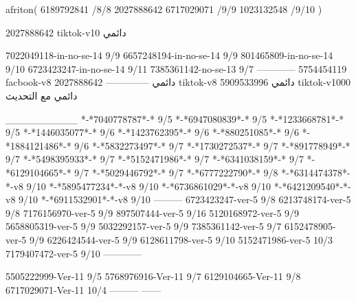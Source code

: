 afriton(
6189792841 /8/8
2027888642
6717029071 /9/9
1023132548 /9/10
)

2027888642 tiktok-v10
دائمي

7022049118-in-no-se-14 9/9
6657248194-in-no-se-14 9/9
801465809-in-no-se-14 9/10
6723423247-in-no-se-14 9/11
7385361142-no-se-13
9/7
------------
5754454119 facbook-v8
دائمي
--------------
2027888642 tiktok-v8
دائمي
5909533996 tiktok-v1000
دائمي مع التحديث

__________
*-*7040778787*-* 9/5
*-*6947080839*-* 9/5
*-*1233668781*-* 9/5
*-*1446035077*-* 9/6
*-*1423762395*-* 9/6
*-*880251085*-* 9/6
*-*1884121486*-* 9/6
*-*5832273497*-* 9/7
*-*1730272537*-* 9/7
*-*891778949*-* 9/7
*-*5498395933*-* 9/7
*-*5152471986*-* 9/7
*-*6341038159*-* 9/7
*-*6129104665*-* 9/7
*-*5029446792*-* 9/7
*-*6777222790*-* 9/8
*-*6314474378*-*-v8 9/10
*-*5895477234*-*-v8 9/10
*-*6736861029*-*-v8 9/10
*-*6421209540*-*-v8 9/10
*-*6911532901*-*-v8 9/10
---------
6723423247-ver-5 9/8
6213748174-ver-5 9/8
7176156970-ver-5 9/9
897507444-ver-5 9/16
5120168972-ver-5 9/9
5658805319-ver-5 9/9
5032292157-ver-5 9/9
7385361142-ver-5 9/7
6152478905-ver-5 9/9
6226424544-ver-5 9/9
6128611798-ver-5 9/10
5152471986-ver-5 10/3
7179407472-ver-5 9/10
------------

5505222999-Ver-11
9/5
5768976916-Ver-11
9/7
6129104665-Ver-11
9/8
6717029071-Ver-11
10/4
---------
------
